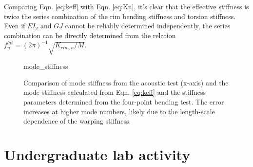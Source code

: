 \documentclass[../thesis.tex]{subfiles}
\begin{document}
Comparing Eqn. \eqref{eq:keff} with Eqn. \eqref{eq:Kn}, it's clear that the effective stiffness is twice the series combination of the rim bending stiffness and torsion stiffness. Even if $EI_{2}$ and $GJ$ cannot be reliably determined independently, the series combination can be directly determined from the relation $f_n^{lat} = (2\pi)^{-1}\sqrt{K_{rim,n}/M}$.

\begin{figure}
  {mode_stiffness}
  \caption{Comparison of mode stiffness from the acoustic test (x-axis) and the mode stiffness calculated from Eqn. \eqref{eq:keff} and the stiffness parameters determined from the four-point bending test. The error increases at higher mode numbers, likely due to the length-scale dependence of the warping stiffness.}
  \label{fig:keff}
\end{figure}


\section{Undergraduate lab activity}
\inprogress
\end{document}

